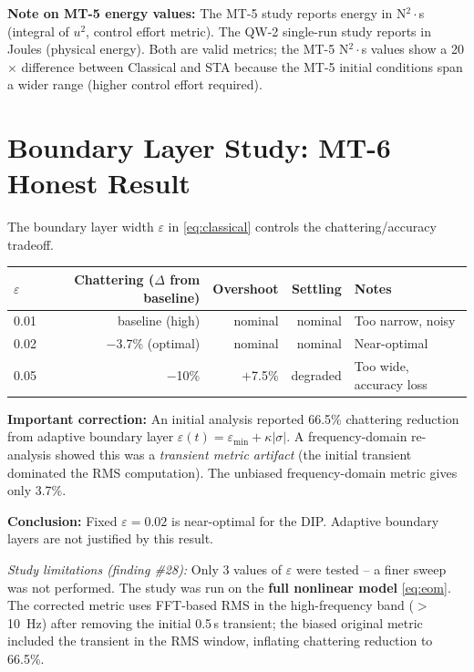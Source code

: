 \documentclass[11pt, a4paper]{article}
\begin{document}
\textbf{Note on MT-5 energy values:} The MT-5 study reports energy in N$^2\cdot$s
(integral of $u^2$, control effort metric). The QW-2 single-run study reports
in Joules (physical energy). Both are valid metrics; the MT-5 N$^2\cdot$s
values show a 20$\times$ difference between Classical and STA because the
MT-5 initial conditions span a wider range (higher control effort required).

\section{Boundary Layer Study: MT-6 Honest Result}

The boundary layer width $\varepsilon$ in \eqref{eq:classical}
controls the chattering/accuracy tradeoff.

\begin{center}
\begin{tabular}{@{}lrrrl@{}}
\toprule
$\varepsilon$ & \textbf{Chattering ($\Delta$ from baseline)} &
  \textbf{Overshoot} & \textbf{Settling} & \textbf{Notes} \\
\midrule
0.01 & baseline (high)   & nominal & nominal   & Too narrow, noisy \\
0.02 & $-$3.7\% (optimal) & nominal & nominal   & Near-optimal \\
0.05 & $-$10\%            & $+$7.5\% & degraded  & Too wide, accuracy loss \\
\bottomrule
\end{tabular}
\end{center}

\textbf{Important correction:} An initial analysis reported 66.5\% chattering
reduction from adaptive boundary layer $\varepsilon(t) = \varepsilon_\text{min}
+ \kappa|\sigma|$. A frequency-domain re-analysis showed this was a
\textit{transient metric artifact} (the initial transient dominated the
RMS computation). The unbiased frequency-domain metric gives only 3.7\%.

\textbf{Conclusion:} Fixed $\varepsilon = 0.02$ is near-optimal for the DIP.
Adaptive boundary layers are not justified by this result.

\textit{Study limitations (finding \#28):}
Only 3 values of $\varepsilon$ were tested -- a finer sweep was not performed.
The study was run on the \textbf{full nonlinear model} \eqref{eq:eom}.
The corrected metric uses FFT-based RMS in the high-frequency band ($>$10~Hz)
after removing the initial 0.5\,s transient; the biased original metric
included the transient in the RMS window, inflating chattering reduction
to 66.5\%.
\end{document}

